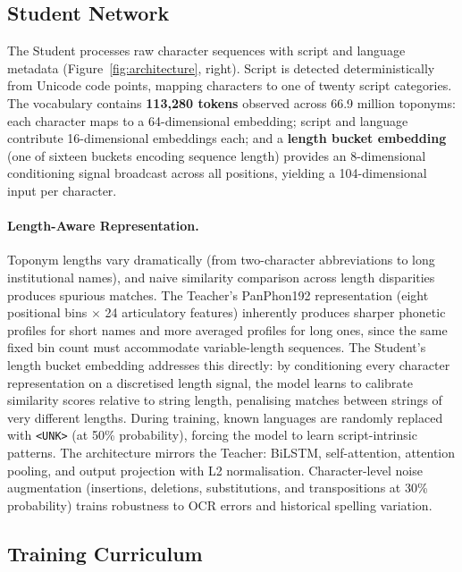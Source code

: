 \documentclass[11pt,a4paper]{article}
\begin{document}
\subsection{Student Network}
\label{subsec:student}

The Student processes raw character sequences with script and language metadata (Figure~\ref{fig:architecture}, right). Script is detected deterministically from Unicode code points, mapping characters to one of twenty script categories. The vocabulary contains \textbf{113,280 tokens} observed across 66.9 million toponyms: each character maps to a 64-dimensional embedding; script and language contribute 16-dimensional embeddings each; and a \textbf{length bucket embedding} (one of sixteen buckets encoding sequence length) provides an 8-dimensional conditioning signal broadcast across all positions, yielding a 104-dimensional input per character.

\paragraph{Length-Aware Representation.} Toponym lengths vary dramatically (from two-character abbreviations to long institutional names), and naive similarity comparison across length disparities produces spurious matches. The Teacher's PanPhon192 representation (eight positional bins $\times$ 24 articulatory features) inherently produces sharper phonetic profiles for short names and more averaged profiles for long ones, since the same fixed bin count must accommodate variable-length sequences. The Student's length bucket embedding addresses this directly: by conditioning every character representation on a discretised length signal, the model learns to calibrate similarity scores relative to string length, penalising matches between strings of very different lengths. During training, known languages are randomly replaced with \texttt{<UNK>} (at 50\% probability), forcing the model to learn script-intrinsic patterns. The architecture mirrors the Teacher: BiLSTM, self-attention, attention pooling, and output projection with L2 normalisation. Character-level noise augmentation (insertions, deletions, substitutions, and transpositions at 30\% probability) trains robustness to OCR errors and historical spelling variation.

\subsection{Training Curriculum}
\label{subsec:training}
\end{document}
